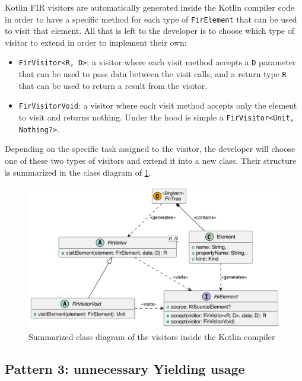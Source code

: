 \documentclass[12pt,a4paper,openright,twoside]{book}
\begin{document}
Kotlin \ac{FIR} visitors are automatically generated inside the Kotlin compiler 
code in order to have a specific method for each type of \lstinline{FirElement}
that can be used to visit that element. All that is left to the developer is to
choose which type of visitor to extend in order to implement their own:

\begin{itemize}
  \item \lstinline{FirVisitor<R, D>}: a visitor where each visit method accepts
a \lstinline{D} parameter that can be used to pass data between the visit calls,
and a return type \lstinline{R} that can be used to return a result from the 
visitor.
  \item \lstinline{FirVisitorVoid}: a visitor where each visit method accepts
only the element to visit and returns nothing. Under the hood is simple a 
\lstinline{FirVisitor<Unit, Nothing?>}.
\end{itemize}

Depending on the specific task assigned to the visitor, the developer will
choose one of these two types of visitors and extend it into a new class. Their
structure is summarized in the class diagram of
\cref{fig:fir-visitors-class-diagram}.

\begin{figure}
  \centering
  \includegraphics[width=.7\linewidth]{figures/fir-visitors.pdf}
  \caption{Summarized class diagram of the visitors inside the Kotlin 
  compiler}
  \label{fig:fir-visitors-class-diagram}
\end{figure}

\subsection{Pattern 3: unnecessary Yielding usage}
\end{document}
